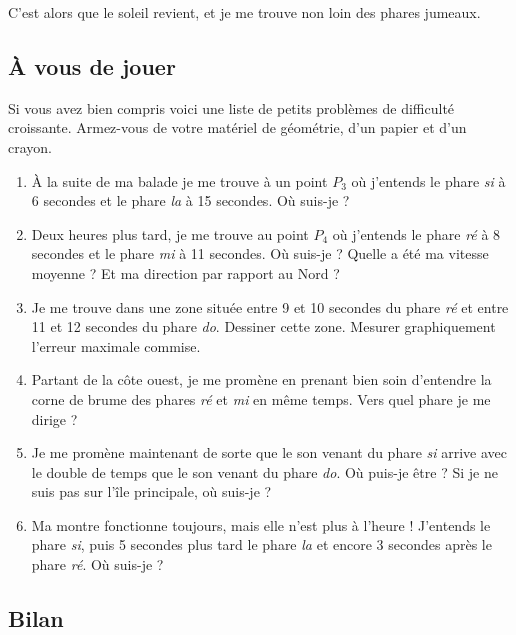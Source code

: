 \documentclass[class=report,crop=false]{standalone}
\begin{document}
C'est alors que le soleil revient, et je me trouve non loin des phares jumeaux.



\subsection{\`A vous de jouer}

Si vous avez bien compris voici une liste de petits problèmes de difficulté croissante.
Armez-vous de votre matériel de géométrie, d'un papier et d'un crayon.


\begin{enumerate}
  \item \`A la suite de ma balade je me trouve à un point $P_3$
  où j'entends le phare \emph{si} à 6 secondes et le phare \emph{la}
  à 15 secondes. Où suis-je ?
  
  \item Deux heures plus tard, je me trouve au point $P_4$ où j'entends le phare
  \emph{ré} à 8 secondes et le phare \emph{mi} à 11 secondes. Où suis-je ?
  Quelle a été ma vitesse moyenne ? Et ma direction par rapport au Nord ?
  
  \item Je me trouve dans une zone située entre 9 et 10 secondes du phare \emph{ré}
  et entre 11 et 12 secondes du phare \emph{do}. Dessiner cette zone. Mesurer graphiquement
  l'erreur maximale commise. 
  
  \item Partant de la côte ouest, je me promène en prenant bien soin 
  d'entendre la corne de brume des phares \emph{ré} et \emph{mi} en même temps.
  Vers quel phare je me dirige ?
  
  \item Je me promène maintenant de sorte que le son venant du phare \emph{si}
  arrive avec le double de temps que le son venant du phare \emph{do}.
  Où puis-je être ? Si je ne suis pas sur l'île principale, où suis-je ?
  
  \item Ma montre fonctionne toujours, mais elle n'est plus à l'heure ! 
  J'entends le phare \emph{si}, puis 5 secondes plus tard le phare \emph{la}
  et encore 3 secondes après le phare \emph{ré}. Où suis-je ?
  
  
\end{enumerate}

\subsection{Bilan}
\end{document}
